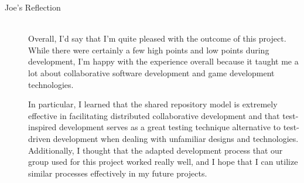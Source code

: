 \documentclass{article}
\begin{document}
\begin{description}
			\item[Joe's Reflection] \hfill \\
			Overall, I'd say that I'm quite pleased with the outcome of this
			project.  While there were certainly a few high points and low points
			during development, I'm happy with the experience overall because it
			taught me a lot about collaborative software development and game
			development technologies.

			In particular, I learned that the shared repository model is extremely
			effective in facilitating distributed collaborative development and
			that test-inspired development serves as a great testing technique
			alternative to test-driven development when dealing with unfamiliar
			designs and technologies.  Additionally, I thought that the adapted
			development process that our group used for this project worked really
			well, and I hope that I can utilize similar processes effectively
			in my future projects.
	\end{description}
\end{document}
